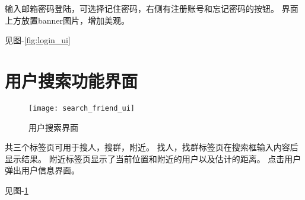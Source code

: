 输入邮箱密码登陆，可选择记住密码，右侧有注册账号和忘记密码的按钮。
界面上方放置banner图片，增加美观。

见图-\ref{fig:login_ui}


\section{用户搜索功能界面}
\begin{figure}[h]
	\centering
	\texttt{[image: search\_friend\_ui]}
	\caption{用户搜索界面} \label{fig:search_friend_ui}
\end{figure}

共三个标签页可用于搜人，搜群，附近。
找人，找群标签页在搜索框输入内容后显示结果。
附近标签页显示了当前位置和附近的用户以及估计的距离。
点击用户弹出用户信息界面。

见图-\ref{fig:search_friend_ui}
